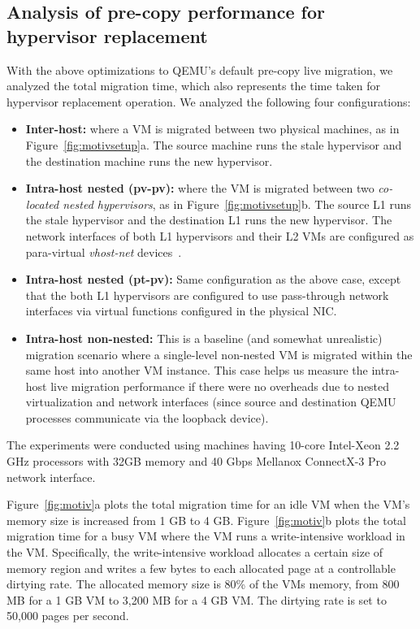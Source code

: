 \subsection{Analysis of pre-copy performance for hypervisor replacement}
With the above optimizations to QEMU's default pre-copy live migration, 
we analyzed the total migration time, which also represents the time taken 
for hypervisor replacement operation.  We analyzed the following four configurations:
\begin{itemize}[leftmargin=0.15 in]
\parskip 0mm
\itemsep 0mm
\item {\bf Inter-host:} where a VM is migrated between two physical machines, as in Figure~\ref{fig:motivsetup}a. The source machine runs the stale hypervisor and the destination machine runs the new hypervisor.
\item {\bf Intra-host nested (pv-pv):} where the VM is migrated between two {\em co-located nested hypervisors}, as in Figure~\ref{fig:motivsetup}b. The source L1 runs the stale hypervisor and the destination L1 runs the new hypervisor. The network interfaces of both L1 hypervisors and their L2 VMs are configured as para-virtual {\em vhost-net} devices~\cite{vhost-net}.
\item {\bf Intra-host nested (pt-pv):} Same configuration as the above case, except that the both L1 hypervisors are configured to use pass-through network interfaces via virtual functions configured in the physical NIC.
\item {\bf Intra-host non-nested:} This is a baseline (and somewhat unrealistic) migration scenario where a single-level non-nested VM is migrated within the same host into another VM instance. This case helps us measure the intra-host live migration performance if there were no overheads due to nested virtualization and network interfaces (since source and destination QEMU processes communicate via the loopback device).
\end{itemize}
The experiments were conducted using machines having 10-core Intel-Xeon 2.2 GHz processors with 32GB memory 
and 40 Gbps Mellanox ConnectX-3 Pro network interface. 

Figure~\ref{fig:motiv}a plots the total migration time for an 
idle VM when the VM's memory size is increased 
from  1 GB to 4 GB. 
Figure~\ref{fig:motiv}b plots the total migration time for a busy VM
where the VM runs a write-intensive workload in the VM. Specifically, the 
write-intensive workload allocates a certain size of memory region and writes a few 
bytes to each allocated page at a controllable dirtying rate. 
The allocated memory size is 80\% of the VMs memory,  from 800 MB for a 1 GB VM to 3,200 MB for a 4 GB VM. 
The dirtying rate is set to 50,000 pages per second.

